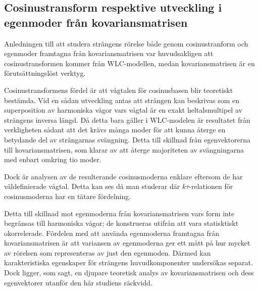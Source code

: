 \subsection{Cosinustransform respektive utveckling i egenmoder från kovariansmatrisen}

Anledningen till att studera strängens rörelse både genom cosinustranform och egenmoder framtagna från kovariansmatrisen var huvudsakligen att cosinustransformen kommer från WLC-modellen, medan kovariansmatrisen är en förutsättningslöst verktyg.

Cosinustransformens fördel är att vågtalen för cosinusbasen blir teoretiskt bestämda. Vid en sådan utveckling antas att strängen kan beskrivas som en superposition av harmoniska vågor vars vågtal är en exakt heltalsmultipel av strängens inversa längd. Då detta bara gäller i WLC-modelen är resultatet från verkligheten sådant att det krävs många moder för att kunna återge en betydande del av strängarnas svängning. Detta till skillnad från egenvektorerna till kovariansmatrisen, som klarar av att återge majoriteten av svängningarna med enbart omkring tio moder.

Dock är analysen av de resulterande cosinusmoderna enklare eftersom de har väldefinierade vågtal. Detta kan ses då man studerar  där $k\tau$-relationen för cosinusmoderna har en tätare fördelning.

Detta till skillnad mot egenmoderna från kovariansmatrisen vars form inte begränsas till harmoniska vågor; de konstrueras utifrån att vara statisktiskt okorrelerade. Fördelen med att använda egenmoderna framtagna från kovariansmatrisen är att variansen av egenmoderna ger ett mått på hur mycket av rörelsen som representeras av just den egenmoden. Därmed kan karakteristiska egenskaper för strängens huvudkomponenter undersökas separat. Dock ligger, som sagt, en djupare teoretisk analys av kovariansmatrisen och dess egenvektorer utanför den här studiens räckvidd. 

